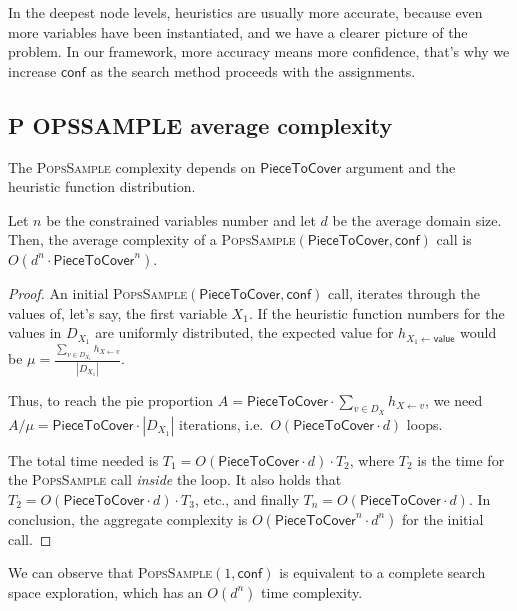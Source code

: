 \documentclass{ws-ijait}
\begin{document}
In the deepest node levels, heuristics are usually more
accurate, because even more variables have been
instantiated, and we have a clearer picture of the problem.
In our framework, more accuracy means more confidence,
that's why we increase $\mathsf{conf}$ as the search method
proceeds with the assignments.

\newcommand{\PoPS}{\textbf{\normalsize P\small O\normalsize
                           PS}}
\newcommand{\PopsSample}{\textbf{\normalsize P\small
                         OPS\normalsize S\small AMPLE}}

\subsection{\PopsSample{} average complexity}

The \textsc{PopsSample} complexity depends on
$\mathsf{PieceToCover}$ argument and the heuristic function
distribution.
\begin{lemma}
  Let $n$ be the constrained variables number and let $d$ be
  the average domain size. Then, the average complexity of a
  \textsc{PopsSample}$(\mathsf{PieceToCover},\mathsf{conf})$
  call is $O(d^n \cdot \mathsf{PieceToCover}^n)$.
\end{lemma}
\begin{proof}
  An initial
  \textsc{PopsSample}$(\mathsf{PieceToCover},\mathsf{conf})$
  call, iterates through the values of, let's say, the first
  variable $X_1$. If the heuristic function numbers for the
  values in $D_{X_1}$ are uniformly distributed, the
  expected value for $h_{X_1 \gets \mathsf{value}}$ would be
  $\mu = \frac{\sum_{v \in D_{X_1}} h_{X \gets
  v}}{|D_{X_1}|}$.

  Thus, to reach the pie proportion $A =
  \mathsf{PieceToCover} \cdot \sum_{v \in D_X} h_{X \gets
  v}$, we need $A / \mu = \mathsf{PieceToCover} \cdot
  |D_{X_1}|$ iterations, i.e.\ 
  $O(\mathsf{PieceToCover} \cdot d)$ loops.

  The total time needed is $T_1 = O(\mathsf{PieceToCover}
  \cdot d) \cdot T_2$, where $T_2$ is the time for the
  \textsc{PopsSample} call \emph{inside} the loop. It also
  holds that $T_2 = O(\mathsf{PieceToCover} \cdot d) \cdot
  T_3$, etc., and finally $T_n = O(\mathsf{PieceToCover}
  \cdot d)$. In conclusion, the aggregate complexity is
  $O(\mathsf{PieceToCover}^n \cdot d^n)$ for the initial
  call.
\end{proof}
We can observe that \textsc{PopsSample}$(1,\mathsf{conf})$
is equivalent to a complete search space exploration, which
has an $O(d^n)$ time complexity.
\end{document}
